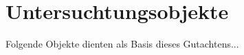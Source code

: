 \section{Untersuchtungsobjekte}
\label{sec:untersuchtungsobjekte}

Folgende Objekte dienten als Basis dieses Gutachtens...